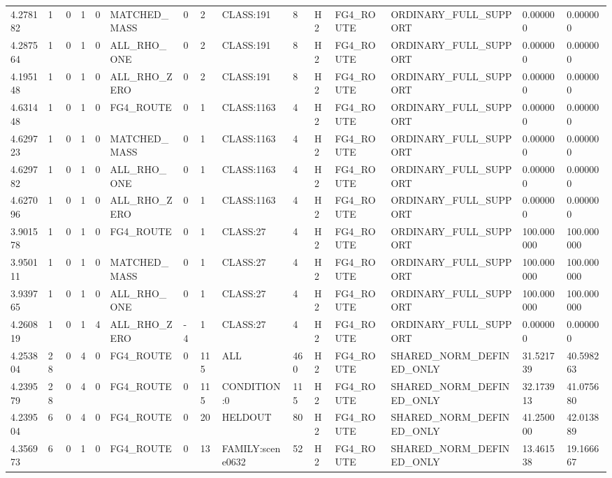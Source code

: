 \begin{tabular}{lllllllllllllll}
4.278182 & 1 & 0 & 1 & 0 & MATCHED\_MASS & 0 & 2 & CLASS:191 & 8 & H2 & FG4\_ROUTE & ORDINARY\_FULL\_SUPPORT & 0.000000 & 0.000000 \\
4.287564 & 1 & 0 & 1 & 0 & ALL\_RHO\_ONE & 0 & 2 & CLASS:191 & 8 & H2 & FG4\_ROUTE & ORDINARY\_FULL\_SUPPORT & 0.000000 & 0.000000 \\
4.195148 & 1 & 0 & 1 & 0 & ALL\_RHO\_ZERO & 0 & 2 & CLASS:191 & 8 & H2 & FG4\_ROUTE & ORDINARY\_FULL\_SUPPORT & 0.000000 & 0.000000 \\
4.631448 & 1 & 0 & 1 & 0 & FG4\_ROUTE & 0 & 1 & CLASS:1163 & 4 & H2 & FG4\_ROUTE & ORDINARY\_FULL\_SUPPORT & 0.000000 & 0.000000 \\
4.629723 & 1 & 0 & 1 & 0 & MATCHED\_MASS & 0 & 1 & CLASS:1163 & 4 & H2 & FG4\_ROUTE & ORDINARY\_FULL\_SUPPORT & 0.000000 & 0.000000 \\
4.629782 & 1 & 0 & 1 & 0 & ALL\_RHO\_ONE & 0 & 1 & CLASS:1163 & 4 & H2 & FG4\_ROUTE & ORDINARY\_FULL\_SUPPORT & 0.000000 & 0.000000 \\
4.627096 & 1 & 0 & 1 & 0 & ALL\_RHO\_ZERO & 0 & 1 & CLASS:1163 & 4 & H2 & FG4\_ROUTE & ORDINARY\_FULL\_SUPPORT & 0.000000 & 0.000000 \\
3.901578 & 1 & 0 & 1 & 0 & FG4\_ROUTE & 0 & 1 & CLASS:27 & 4 & H2 & FG4\_ROUTE & ORDINARY\_FULL\_SUPPORT & 100.000000 & 100.000000 \\
3.950111 & 1 & 0 & 1 & 0 & MATCHED\_MASS & 0 & 1 & CLASS:27 & 4 & H2 & FG4\_ROUTE & ORDINARY\_FULL\_SUPPORT & 100.000000 & 100.000000 \\
3.939765 & 1 & 0 & 1 & 0 & ALL\_RHO\_ONE & 0 & 1 & CLASS:27 & 4 & H2 & FG4\_ROUTE & ORDINARY\_FULL\_SUPPORT & 100.000000 & 100.000000 \\
4.260819 & 1 & 0 & 1 & 4 & ALL\_RHO\_ZERO & -4 & 1 & CLASS:27 & 4 & H2 & FG4\_ROUTE & ORDINARY\_FULL\_SUPPORT & 0.000000 & 0.000000 \\
4.253804 & 28 & 0 & 4 & 0 & FG4\_ROUTE & 0 & 115 & ALL & 460 & H2 & FG4\_ROUTE & SHARED\_NORM\_DEFINED\_ONLY & 31.521739 & 40.598263 \\
4.239579 & 28 & 0 & 4 & 0 & FG4\_ROUTE & 0 & 115 & CONDITION:0 & 115 & H2 & FG4\_ROUTE & SHARED\_NORM\_DEFINED\_ONLY & 32.173913 & 41.075680 \\
4.239504 & 6 & 0 & 4 & 0 & FG4\_ROUTE & 0 & 20 & HELDOUT & 80 & H2 & FG4\_ROUTE & SHARED\_NORM\_DEFINED\_ONLY & 41.250000 & 42.013889 \\
4.356973 & 6 & 0 & 1 & 0 & FG4\_ROUTE & 0 & 13 & FAMILY:scene0632 & 52 & H2 & FG4\_ROUTE & SHARED\_NORM\_DEFINED\_ONLY & 13.461538 & 19.166667 \\

\end{tabular}
